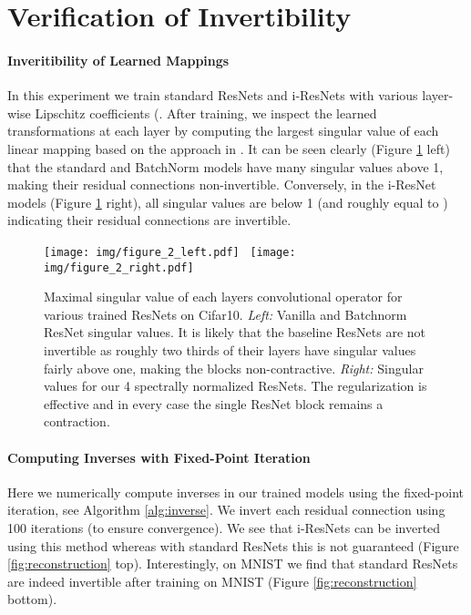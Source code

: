 \documentclass{article}
\begin{document}
\section{Verification of Invertibility}
\paragraph{Inveritibility of Learned Mappings} In this experiment we train standard ResNets and i-ResNets with various layer-wise Lipschitz coefficients (. After training, we inspect the learned transformations at each layer by computing the largest singular value of each linear mapping based on the approach in \citet{singularValConv}. It can be seen clearly (Figure \ref{fig:singularvalues} left) that the standard and BatchNorm models have many singular values above 1, making their residual connections non-invertible. Conversely, in the i-ResNet models (Figure \ref{fig:singularvalues} right), all singular values are below 1 (and roughly equal to ) indicating their residual connections are invertible. 
\label{sec:invver}
\begin{figure}[H]
    {{\texttt{[image: img/figure\_2\_left.pdf]} }}\,
    {{\texttt{[image: img/figure\_2\_right.pdf]} }}\vspace{-2mm}
    \caption{Maximal singular value of each layers convolutional operator for various trained ResNets on Cifar10.  \textit{Left:} Vanilla and Batchnorm ResNet singular values. It is likely that the baseline ResNets are not invertible as roughly two thirds of their layers have singular values fairly above one, making the blocks non-contractive. \textit{Right:} Singular values for our 4 spectrally normalized ResNets. The regularization is effective and in every case the single ResNet block remains a contraction.}\label{fig:singularvalues}
\end{figure}

\paragraph{Computing Inverses with Fixed-Point Iteration} Here we numerically compute inverses in our trained models using the fixed-point iteration, see Algorithm \ref{alg:inverse}. We invert each residual connection using 100 iterations (to ensure convergence). We see that i-ResNets can be inverted using this method whereas with standard ResNets this is not guaranteed (Figure \ref{fig:reconstruction} top). Interestingly, on MNIST we find that standard ResNets are indeed invertible after training on MNIST (Figure \ref{fig:reconstruction} bottom).  
\end{document}
